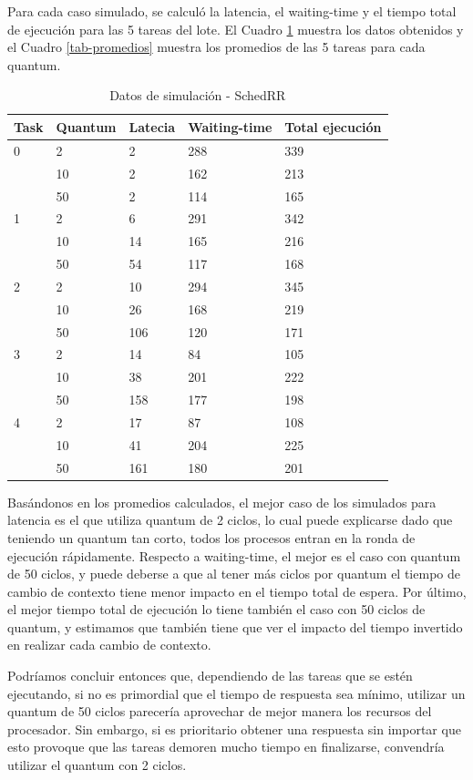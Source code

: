 Para cada caso simulado, se calculó la latencia, el waiting-time y el tiempo total de ejecución para las 5 tareas del lote. El Cuadro \ref{tab-datos} muestra los datos obtenidos y el Cuadro \ref{tab-promedios} muestra los promedios de las 5 tareas para cada quantum.

\begin{table}[!htb]
\begin{center}
\begin{tabular}{| l | l | l | l | l |}
\hline
Task & Quantum & Latecia & Waiting-time & Total ejecución\\
\hline
0 	& 2 & 2 & 288 & 339\\
	& 10& 2 & 162 & 213\\
	& 50& 2 & 114 & 165\\
\hline
1	& 2 & 6 & 291 & 342\\
	& 10& 14& 165 & 216\\
	& 50& 54& 117 & 168\\
\hline
2	& 2 & 10 & 294 & 345\\
	& 10& 26 & 168 & 219\\
	& 50& 106& 120 & 171\\
\hline
3	& 2 & 14 & 84 & 105\\
	& 10& 38 & 201& 222\\
	& 50& 158& 177& 198\\
\hline
4	& 2 & 17 & 87 & 108\\
	& 10& 41 & 204&	225\\
	& 50& 161& 180& 201\\
\hline
\end{tabular}
\end{center}
\caption{Datos de simulación - SchedRR}\label{tab-datos}
\end{table}


Basándonos en los promedios calculados, el mejor caso de los simulados para latencia es el que utiliza quantum de 2 ciclos, lo cual puede explicarse dado que teniendo un quantum tan corto, todos los procesos entran en la ronda de ejecución rápidamente. Respecto a waiting-time, el mejor es el caso con quantum de 50 ciclos, y puede deberse a que al tener más ciclos por quantum el tiempo de cambio de contexto tiene menor impacto en el tiempo total de espera.  Por último, el mejor tiempo total de ejecución lo tiene también el caso con 50 ciclos de quantum, y estimamos que también tiene que ver el impacto del tiempo invertido en realizar cada cambio de contexto.

Podríamos concluir entonces que, dependiendo de las tareas que se estén ejecutando, si no es primordial que el tiempo de respuesta sea mínimo, utilizar un quantum de 50  ciclos parecería aprovechar de mejor manera los recursos del procesador. Sin embargo, si es prioritario obtener una respuesta sin importar que esto provoque  que las tareas demoren mucho tiempo en finalizarse, convendría utilizar el quantum con 2 ciclos.